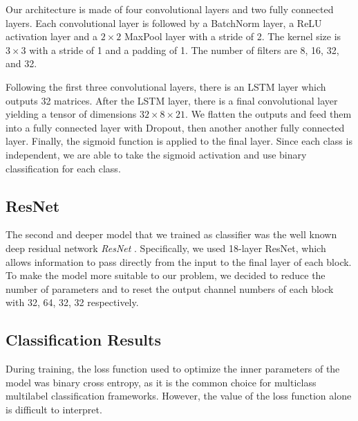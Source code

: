 \documentclass[runningheads,a4paper]{llncs}
\begin{document}
Our architecture is made of four convolutional layers and two fully connected layers. Each convolutional layer is followed by a BatchNorm layer, a ReLU activation layer and a $2 \times 2$  MaxPool layer with a stride of 2. The kernel size is $3 \times 3$ with a stride of 1 and a padding of 1. The number of filters are 8, 16, 32, and 32.

Following the first three convolutional layers, there is an LSTM layer which outputs 32 matrices. After the LSTM layer, there is a final convolutional layer yielding a tensor of dimensions $32\times 8 \times 21$. We flatten the outputs and feed them into a fully connected layer with Dropout, then another another fully connected layer. Finally, the sigmoid function is applied to the final layer. Since each class is independent, we are able to take the sigmoid activation and use binary classification for each class. %

\subsection{ResNet}

The second and deeper model that we trained as classifier was the well known deep residual network \emph{ResNet} \cite{He15}. Specifically, we used 18-layer ResNet, which allows information to pass directly from the input to the final layer of each block. To make the model more suitable to our problem, we decided to reduce the number of parameters and to reset the output channel numbers of each block with 32, 64, 32, 32 respectively.

\subsection{Classification Results}

During training, the loss function used to optimize the inner parameters of the model was binary cross entropy, as it is the common choice for multiclass multilabel classification frameworks. However, the value of the loss function alone is difficult to interpret.
\end{document}

